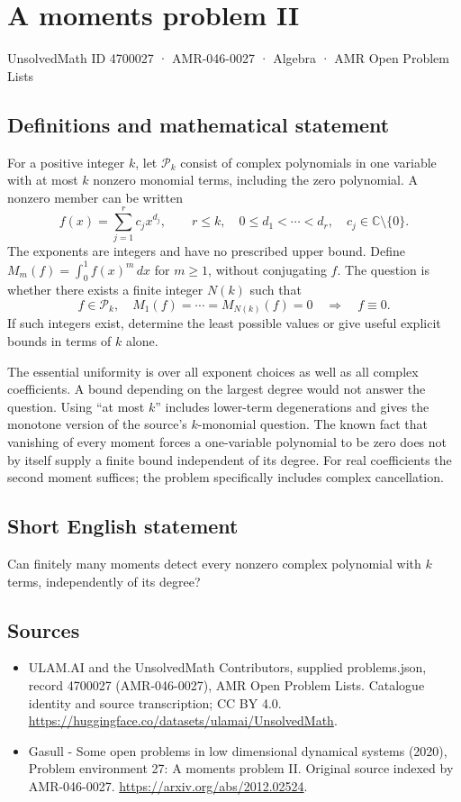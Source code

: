 \documentclass[11pt,a4paper]{article}
\begin{document}
\section*{A moments problem II}\label{4700027}
{\small UnsolvedMath ID 4700027 · AMR-046-0027 · Algebra · AMR Open Problem Lists}
\subsection{Definitions and mathematical statement}
For a positive integer $k$, let $\mathcal P_k$ consist of complex
polynomials in one variable with at most $k$ nonzero monomial terms,
including the zero polynomial. A nonzero member can be written
\[
 f(x)=\sum_{j=1}^r c_jx^{d_j},\qquad
 r\le k,\quad 0\le d_1<\cdots<d_r,\quad c_j\in\mathbb C\setminus\{0\}.
\]
The exponents are integers and have no prescribed upper bound. Define
$M_m(f)=\int_0^1 f(x)^m\,dx$ for $m\ge1$, without conjugating $f$.
The question is whether there exists a finite integer $N(k)$ such that
\[
 f\in\mathcal P_k,\quad
 M_1(f)=\cdots=M_{N(k)}(f)=0
 \quad\Longrightarrow\quad f\equiv0.
\]
If such integers exist, determine the least possible values or give useful
explicit bounds in terms of $k$ alone.

The essential uniformity is over all exponent choices as well as all
complex coefficients. A bound depending on the largest degree would not
answer the question. Using ``at most $k$'' includes lower-term degenerations
and gives the monotone version of the source's $k$-monomial question.
The known fact that vanishing of every moment forces a one-variable
polynomial to be zero does not by itself supply a finite bound independent
of its degree. For real coefficients the second moment suffices; the
problem specifically includes complex cancellation.
\subsection{Short English statement}
Can finitely many moments detect every nonzero complex polynomial with $k$ terms, independently of its degree?
\subsection{Sources}
\begin{itemize}
\item[S1] ULAM.AI and the UnsolvedMath Contributors, supplied problems.json, record 4700027 (AMR-046-0027), AMR Open Problem Lists. Catalogue identity and source transcription; CC BY 4.0.
\url{https://huggingface.co/datasets/ulamai/UnsolvedMath}.
\item[S2] Gasull - Some open problems in low dimensional dynamical systems (2020), Problem environment 27: A moments problem II. Original source indexed by AMR-046-0027.
\url{https://arxiv.org/abs/2012.02524}.
\end{itemize}
\end{document}
